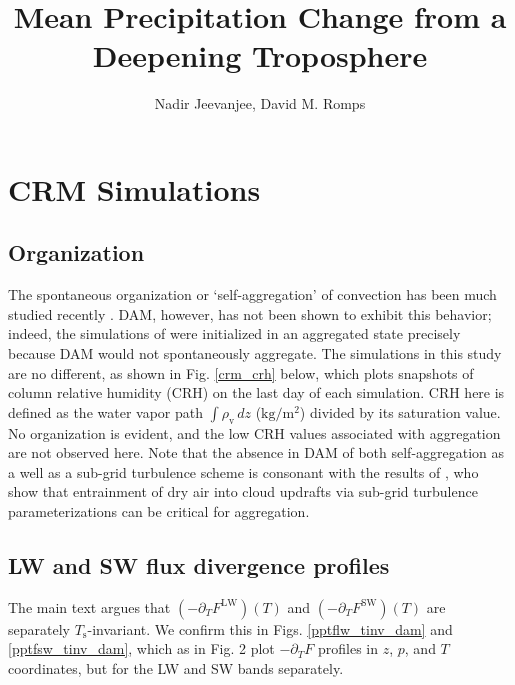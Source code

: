 \documentclass[9pt,twoside,lineno]{pnas-new}
\title{Mean Precipitation Change from a Deepening Troposphere}
\author{Nadir Jeevanjee, David M. Romps}
\newcommand{\ppt}{\ensuremath{\partial_T}}
\newcommand{\FLW}{\ensuremath{F^\mathrm{LW}}}
\newcommand{\FSW}{\ensuremath{F^\mathrm{SW}}}
\newcommand{\meter}{\ensuremath{\mathrm{m}}}
\newcommand{\kg}{\ensuremath{\mathrm{kg}}}
\newcommand{\rhov}{\ensuremath{\rho_\mathrm{v}}}
\newcommand{\Ts}{\ensuremath{T_\mathrm{s}}}
\begin{document}

\maketitle

\SItext

\section{CRM Simulations}
\subsection{Organization}
The spontaneous organization or `self-aggregation' of convection has been much studied recently \citep[see the review by][]{wing2017}. DAM, however, has not been shown to exhibit this behavior; indeed, the simulations of \cite{jeevanjee2013} were initialized in an aggregated state precisely because DAM would not spontaneously aggregate. The simulations in this study are no different, as shown in Fig. \ref{crm_crh} below, which plots snapshots of column relative humidity (CRH) on the last day of each simulation. CRH here is defined as the water vapor path $\int \rhov\, dz$ ($\kg/\meter^2$) divided by its saturation value. No organization is evident, and the low CRH values associated with aggregation \cite[0.3 and below, see Fig. 6 of][]{bretherton2005}  are not observed here.  Note that the absence in DAM of both self-aggregation as a well as a sub-grid turbulence scheme is consonant with the results of \cite{tompkins2017}, who show that entrainment of dry air into cloud updrafts via sub-grid turbulence parameterizations can be critical for  aggregation.


\subsection{LW and SW flux divergence profiles}
The main text argues that $(-\ppt \FLW)(T)$ and $(-\ppt \FSW)(T)$ are separately \Ts-invariant. We confirm this in Figs. \ref{pptflw_tinv_dam} and \ref{pptfsw_tinv_dam}, which as in Fig. 2 plot $-\ppt F$ profiles in $z$, $p$, and $T$ coordinates, but for the LW and SW bands separately.

 
\end{document}
